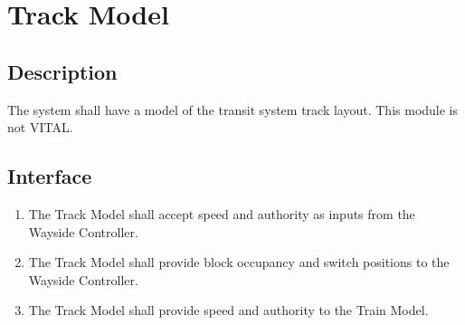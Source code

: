 \documentclass{scrreprt}
\begin{document}
\section{Track Model}

\subsection{Description}
The system shall have a model of the transit system track layout. This module is not VITAL.

\subsection{Interface}
\begin{enumerate}
    \item The Track Model shall accept speed and authority as inputs from the Wayside Controller.
    \item The Track Model shall provide block occupancy and switch positions to the Wayside Controller.
    \item The Track Model shall provide speed and authority to the Train Model.
\end{enumerate}
\end{document}
